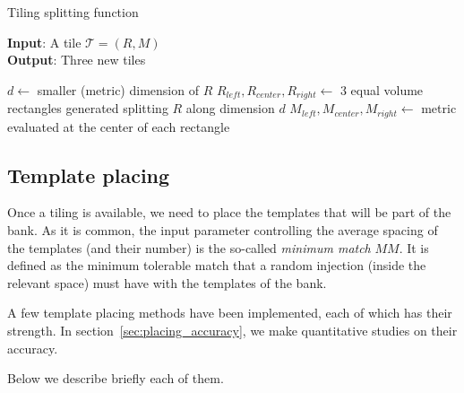 \documentclass[twocolumn,showpacs,preprintnumbers,nofootinbib,prd,
superscriptaddress,10pt]{revtex4-2}
\begin{document}
\begin{algorithm}[H]
	\centering
	\caption{Tiling splitting function}\label{alg:tiling}
	\flushleft
	\hspace*{\algorithmicindent} \textbf{Input}: A tile $\mathcal{T} = \left(R, M\right)$ \\
	\hspace*{\algorithmicindent} \textbf{Output}: Three new tiles
	\begin{algorithmic}
		\State $d \gets $ smaller (metric) dimension of $R$
		\State $R_{left}, R_{center}, R_{right} \gets $ 3 equal volume rectangles generated splitting $R$ along dimension $d$ 
		\State $M_{left}, M_{center}, M_{right} \gets $ metric evaluated at the center of each rectangle
		\State{}
		\EndProcedure
	\end{algorithmic}
\end{algorithm}


\subsection{Template placing} \label{sec:template_placing}

Once a tiling is available, we need to place the templates that will be part of the bank.
As it is common, the input parameter controlling the average spacing of the templates (and their number) is the so-called {\it minimum match} $MM$. It is defined as the minimum tolerable match that a random injection (inside the relevant space) must have with the templates of the bank.

A few template placing methods have been implemented, each of which has their strength. In section~\ref{sec:placing_accuracy}, we make quantitative studies on their accuracy.

Below we describe briefly each of them.
\end{document}
